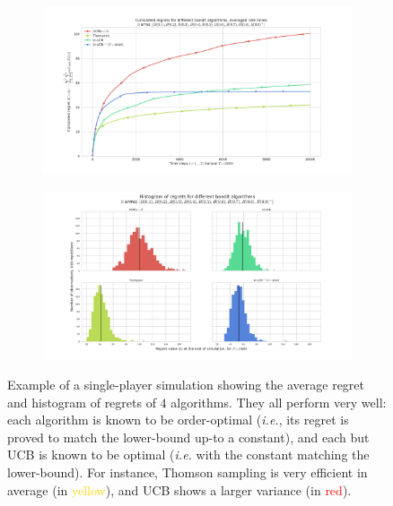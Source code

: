 \documentclass[a4paper,10pt,]{article}
\begin{document}
\begin{figure}
\centering
\begin{subfigure}[b]{0.49\textwidth}
  \includegraphics[width=1.15\textwidth]{plots/paper/3.pdf}
\end{subfigure}
\begin{subfigure}[b]{0.49\textwidth}
  \includegraphics[width=1.15\textwidth]{plots/paper/3_hist.pdf}
\end{subfigure}
\caption{Example of a single-player simulation showing the average regret and histogram of regrets of
\(4\) algorithms. They all perform very well: each algorithm is known to
be order-optimal (\emph{i.e.}, its regret is proved to match the
lower-bound up-to a constant), and each but UCB is known to be optimal
(\emph{i.e.} with the constant matching the
lower-bound). For instance, Thomson sampling is very efficient in average (in \textcolor{gold}{yellow}), and UCB shows a larger variance (in \textcolor{red}{red}).\label{fig:plot1}}
\end{figure}
\end{document}

